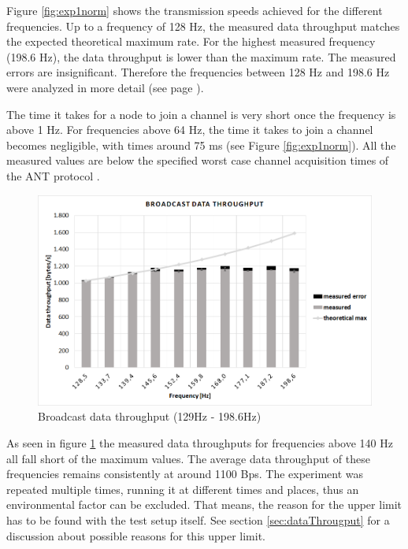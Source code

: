 \begin{description}
	Figure \ref{fig:exp1norm} shows the transmission speeds achieved for the different frequencies. Up to a frequency of 128 Hz, the measured data throughput matches the expected theoretical maximum rate. For the highest measured frequency (198.6 Hz), the data throughput is lower than the maximum rate. The measured errors are insignificant. Therefore the frequencies between 128 Hz and 198.6 Hz were analyzed in more detail (see page \pageref{fig:exp1between}). 
		
	The time it takes for a node to join a channel is very short once the frequency is above 1 Hz. For frequencies above 64 Hz, the time it takes to join a channel becomes negligible, with times around 75 ms (see Figure \ref{fig:exp1norm}). All the measured values are below the specified worst case channel acquisition times of the ANT protocol \cite{AntChan}.
	
	\begin{figure}[H]
		\centering
		\includegraphics[scale=0.5]{content/images/exp1_detail.png}
		\caption{Broadcast data throughput (129Hz - 198.6Hz)}\label{fig:exp1between}
	\end{figure}
	As seen in figure \ref{fig:exp1between} the measured data throughputs for frequencies above 140 Hz all fall short of the maximum values. The average data throughput of these frequencies remains consistently at around 1100 Bps. The experiment was repeated multiple times, running it at different times and places, thus an environmental factor can be excluded. That means, the reason for the upper limit has to be found with the test setup itself. See section \ref{sec:dataThrougput} for a discussion about possible reasons for this upper limit.
	

\end{description}
